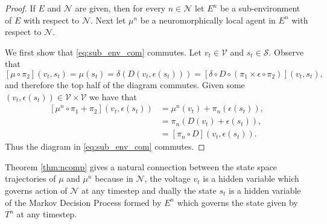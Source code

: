 \documentclass{article} %
\numberwithin{equation}{subsection}
\numberwithin{theorem}{subsection}
\theoremstyle{named}
\def\scriptv{{\mathcal V}}
\def\scriptn{{\mathcal N}}
\def\scripts{{\mathcal S}}
\begin{document}
\begin{proof}
  If $E$ and $\scriptn$ are given, then for every $n \in \scriptn$ let $E^n$ be a sub-environment of $E$ with respect to $\scriptn$. Next let $\mu^n$ be a neuromorphically local agent in $E^n$ with respect to $\scriptn$.

  We first show that \eqref{eq:sub_env_com} commutes. Let $v_t \in \scriptv$ and $s_t \in \scripts$. Observe that
\begin{equation*}
\left[\mu \circ \pi_2\right](v_t, s_t) = \mu(s_t) = \delta\left(D(v_t, \epsilon(s_t))\right) = \left[\delta \circ D \circ (\pi_1 \times \epsilon\circ \pi_2)\right](v_t, s_t),
\end{equation*}
and therefore the top half of the diagram commutes. Given some $(v_t, \epsilon(s_t)) \in \scriptv \times \scriptv$ we have that
\begin{equation*}
  \begin{aligned}
    \left[ \mu^n \circ \pi_1 + \pi_2\right] (v_t, \epsilon(s_t))  &= \mu^n(v_t) + \pi_n(\epsilon(s_t)),\\
     &= \pi_n\left(D(v_t) + \epsilon(s_t)\right), \\
     &= \left[\pi_n\circ D\right](v_t, \epsilon(s_t)).
  \end{aligned}
\end{equation*}
Thus the diagram in \eqref{eq:sub_env_com} commutes.
\end{proof}

Theorem \ref{thm:ncomp} gives a natural connection between the state space trajectories of $\mu$ and $\mu^n$ because in $\scriptn$, the voltage $v_t$ is a hidden variable which governs action of $\scriptn$ at any timestep and dually the state $s_t$ is a hidden variable of the Markov Decision Process formed by $E^n$ which governs the state given by $T^n$ at any timestep.
\end{document}
